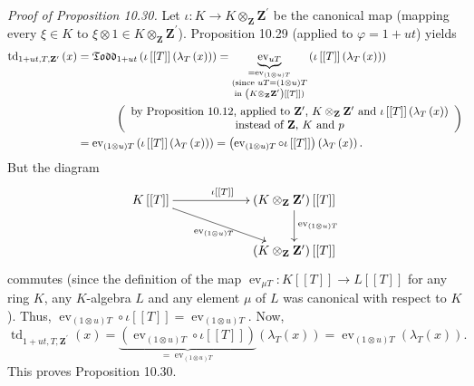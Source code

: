 \documentclass[numbers=enddot,12pt,final,onecolumn,notitlepage]{scrartcl}%
\begin{document}
\textit{Proof of Proposition 10.30.} Let $\iota:K\rightarrow K\otimes
_{\mathbf{Z}}\mathbf{Z}^{\prime}$ be the canonical map (mapping every $\xi\in
K$ to $\xi\otimes1\in K\otimes_{\mathbf{Z}}\mathbf{Z}^{\prime}$). Proposition
10.29 (applied to $\varphi=1+ut$) yields%
\begin{align*}
\operatorname*{td}\nolimits_{1+ut,T,\mathbf{Z}^{\prime}}\left(  x\right)   &
=\mathfrak{Todd}_{1+ut}\left(  \iota\left[  \left[  T\right]  \right]  \left(
\lambda_{T}\left(  x\right)  \right)  \right)  =\underbrace{\operatorname*{ev}%
\nolimits_{uT}}_{\substack{=\operatorname*{ev}\nolimits_{\left(  1\otimes
u\right)  T}\\\text{(since }uT=\left(  1\otimes u\right)  T\\\text{in }\left(
K\otimes_{\mathbf{Z}}\mathbf{Z}^{\prime}\right)  \left[  \left[  T\right]
\right]  \text{)}}}\left(  \iota\left[  \left[  T\right]  \right]  \left(
\lambda_{T}\left(  x\right)  \right)  \right) \\
&  \ \ \ \ \ \ \ \ \ \ \left(
\begin{array}
[c]{c}%
\text{by Proposition 10.12, applied to }\mathbf{Z}^{\prime}\text{, }%
K\otimes_{\mathbf{Z}}\mathbf{Z}^{\prime}\text{ and }\iota\left[  \left[
T\right]  \right]  \left(  \lambda_{T}\left(  x\right)  \right) \\
\text{instead of }\mathbf{Z}\text{, }K\text{ and }p
\end{array}
\right) \\
&  =\operatorname*{ev}\nolimits_{\left(  1\otimes u\right)  T}\left(
\iota\left[  \left[  T\right]  \right]  \left(  \lambda_{T}\left(  x\right)
\right)  \right)  =\left(  \operatorname*{ev}\nolimits_{\left(  1\otimes
u\right)  T}\circ\iota\left[  \left[  T\right]  \right]  \right)  \left(
\lambda_{T}\left(  x\right)  \right)  .
\end{align*}
But the diagram%
\[
\xymatrixcolsep{5pc}\xymatrix{
K \left[\left[T\right]\right] \ar[r]^{\iota \left[\left[T\right]\right]} \ar[dr]_{\operatorname*{ev}_{\left(1\otimes u\right)T}} & \left(K \otimes_{\mathbf Z} \mathbf Z^{\prime}\right) \left[\left[T\right]\right] \ar[d]^{\operatorname*{ev}_{\left(1\otimes u\right)T}} \\
&  \left(K \otimes_{\mathbf Z} \mathbf Z^{\prime}\right) \left[\left[T\right]\right]
}
\]
commutes (since the definition of the map $\operatorname*{ev}\nolimits_{\mu
T}:K\left[  \left[  T\right]  \right]  \rightarrow L\left[  \left[  T\right]
\right]  $ for any ring $K$, any $K$-algebra $L$ and any element $\mu$ of $L$
was canonical with respect to $K$). Thus, $\operatorname*{ev}%
\nolimits_{\left(  1\otimes u\right)  T}\circ\iota\left[  \left[  T\right]
\right]  =\operatorname*{ev}\nolimits_{\left(  1\otimes u\right)  T}$. Now,%
\[
\operatorname*{td}\nolimits_{1+ut,T,\mathbf{Z}^{\prime}}\left(  x\right)
=\underbrace{\left(  \operatorname*{ev}\nolimits_{\left(  1\otimes u\right)
T}\circ\iota\left[  \left[  T\right]  \right]  \right)  }_{=\operatorname*{ev}%
\nolimits_{\left(  1\otimes u\right)  T}}\left(  \lambda_{T}\left(  x\right)
\right)  =\operatorname*{ev}\nolimits_{\left(  1\otimes u\right)  T}\left(
\lambda_{T}\left(  x\right)  \right)  .
\]
This proves Proposition 10.30.
\end{document}
